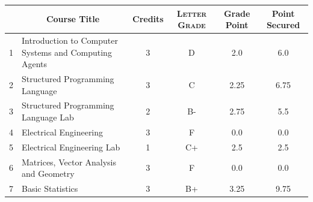 \documentclass[11pt]{article}
\newcommand*{\numtwo}[1]{\pgfmathprintnumber[
                    fixed, precision=2, fixed zerofill=true]{#1}}
\begin{document}
                \begin{center}
                    \renewcommand{\arraystretch}{1.08}
                    
                \begin{tabular}{|c|l|c|>{\scshape}c|c|c|}
                \hline  \rule[-1ex]{0pt}{3.5ex} {\centering{\bf Course Code}} &  \multicolumn{1}{c|}{\textbf{Course Title}}  & {\bf Credits} & {\bf Letter Grade} & {\bf Grade Point} & {\bf Point Secured}  \\ 
                \hline   1 &  Introduction to Computer Systems and Computing Agents		 & 3 & D & 2.0 & 6.0 \\ %
                \hline   2 &  Structured Programming Language		 & 3 & C & 2.25 & 6.75 \\ %
                \hline   3 &  Structured Programming Language Lab		 & 2 & B- & 2.75 & 5.5 \\ %
                \hline   4 &  Electrical Engineering		 & 3 & F & 0.0 & 0.0 \\ %
                \hline   5 &  Electrical Engineering Lab		 & 1 & C+ & 2.5 & 2.5 \\ %
                \hline   6 &  Matrices, Vector Analysis and Geometry		 & 3 & F & 0.0 & 0.0 \\ %
                \hline   7 &  Basic Statistics		 & 3 & B+ & 3.25 & 9.75 \\ %

\hline                %
                \end{tabular}
                \end{center}
                \renewcommand{\arraystretch}{1.03}
\end{document}
